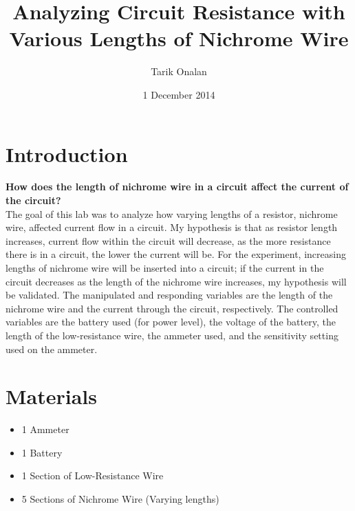 \documentclass{article}
\title{Analyzing Circuit Resistance with Various Lengths of Nichrome Wire}
\date{1 December 2014}
\author{Tarik Onalan}
\numberwithin{equation}{subsection}
\begin{document}
    \maketitle
    \section{Introduction}
        \textbf{How does the length of nichrome wire in a circuit affect the current
        of the circuit?}\\
        The goal of this lab was to analyze how varying lengths of a resistor, nichrome
        wire, affected current flow in a circuit. My hypothesis is that as resistor
        length increases, current flow within the circuit will decrease, as the more
        resistance there is in a circuit, the lower the current will be. For the experiment,
        increasing lengths of nichrome wire will be inserted into a circuit; if the
        current in the circuit decreases as the length of the nichrome wire increases,
        my hypothesis will be validated. The manipulated and responding variables are
        the length of the nichrome wire and the current through the circuit, respectively.
        The controlled variables are the battery used (for power level), the voltage of
        the battery, the length of the low-resistance wire, the ammeter used, and the
        sensitivity setting used on the ammeter.

    \section{Materials}
        \begin{itemize}
            \item 1 Ammeter
            \item 1 Battery
            \item 1 Section of Low-Resistance Wire
            \item 5 Sections of Nichrome Wire (Varying lengths)
        \end{itemize}
\end{document}
